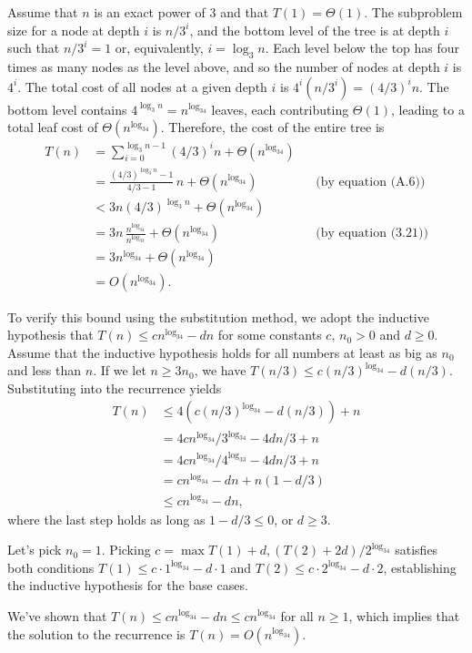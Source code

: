 \subexercise
Assume that $n$ is an exact power of 3 and that $T(1)=\Theta(1)$.
The subproblem size for a node at depth $i$ is $n/3^i$, and the bottom level of the tree is at depth $i$ such that $n/3^i=1$ or, equivalently, $i=\log_3n$.
Each level below the top has four times as many nodes as the level above, and so the number of nodes at depth $i$ is $4^i$.
The total cost of all nodes at a given depth $i$ is $4^i(n/3^i)=(4/3)^in$.
The bottom level contains $4^{\log_3n}=n^{\log_34}$ leaves, each contributing $\Theta(1)$, leading to a total leaf cost of $\Theta(n^{\log_34})$.
Therefore, the cost of the entire tree is
\begin{align*}
    T(n) &= \sum_{i=0}^{\log_3n-1}(4/3)^in+\Theta(n^{\log_34}) \\[1mm]
    &= \frac{(4/3)^{\log_3n}-1}{4/3-1}\,n+\Theta(n^{\log_34}) && \text{(by equation (A.6))} \\[1mm]
    &< 3n(4/3)^{\log_3n}+\Theta(n^{\log_34}) \\[1mm]
    &= 3n\,\frac{n^{\log_34}}{n^{\log_33}}+\Theta(n^{\log_34}) && \text{(by equation (3.21))} \\[2mm]
    &= 3n^{\log_34}+\Theta(n^{\log_34}) \\
    &= O(n^{\log_34}).
\end{align*}

To verify this bound using the substitution method, we adopt the inductive hypothesis that $T(n)\le cn^{\log_34}-dn$ for some constants $c$, $n_0>0$ and $d\ge0$.
Assume that the inductive hypothesis holds for all numbers at least as big as $n_0$ and less than $n$.
If we let $n\ge3n_0$, we have $T(n/3)\le c(n/3)^{\log_34}-d(n/3)$.
Substituting into the recurrence yields
\begin{align*}
    T(n) &\le 4\left(c(n/3)^{\log_34}-d(n/3)\right)+n \\
    &= 4cn^{\log_34}\!/3^{\log_34}-4dn/3+n \\
    &= 4cn^{\log_34}\!/4^{\log_33}-4dn/3+n \\
    &= cn^{\log_34}-dn+n(1-d/3) \\
    &\le cn^{\log_34}-dn,
\end{align*}
where the last step holds as long as $1-d/3\le0$, or $d\ge3$.

Let's pick $n_0=1$.
Picking $c=\max{T(1)+d,(T(2)+2d)/2^{\log_34}}$ satisfies both conditions $T(1)\le c\cdot1^{\log_34}-d\cdot1$ and $T(2)\le c\cdot2^{\log_34}-d\cdot2$, establishing the inductive hypothesis for the base cases.

We've shown that $T(n)\le cn^{\log_34}-dn\le cn^{\log_34}$ for all $n\ge1$, which implies that the solution to the recurrence is $T(n)=O(n^{\log_34})$.

